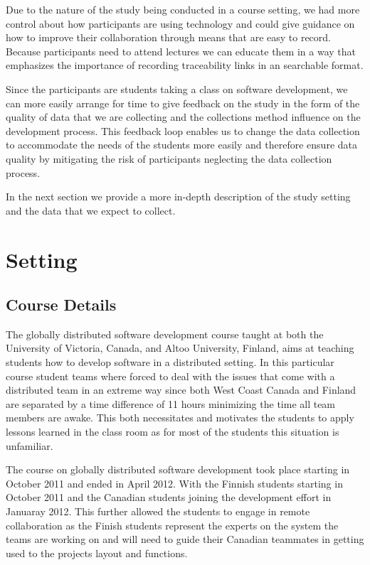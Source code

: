 Due to the nature of the study being conducted in a course setting, we had more control about how participants are using technology and could give guidance on how to improve their collaboration through means that are easy to record.
Because participants need to attend lectures we can educate them in a way that emphasizes the importance of recording traceability links in an searchable format.

Since the participants are students taking a class on software development, we can more easily arrange for time to give feedback on the study in the form of the quality of data that we are collecting and the collections method influence on the development process.
This feedback loop enables us to change the data collection to accommodate the needs of the students more easily and therefore ensure data quality by mitigating the risk of participants neglecting the data collection process. 

In the next section we provide a more in-depth description of the study setting and the data that we expect to collect.

\section{Setting}
\subsection{Course Details}
The globally distributed software development course taught at both the University of Victoria, Canada, and Altoo University, Finland, aims at teaching students how to develop software in a distributed setting.
In this particular course student teams where forced to deal with the issues that come with a distributed team in an extreme way since both West Coast Canada and Finland are separated by a time difference of 11 hours minimizing the time all team members are awake.
This both necessitates and motivates the students to apply lessons learned in the class room as for most of the students this situation is unfamiliar.

The course on globally distributed software development took place starting in October 2011 and ended in April 2012.
With the Finnish students starting in October 2011 and the Canadian students joining the development effort in Januaray 2012.
This further allowed the students to engage in remote collaboration as the Finish students represent the experts on the system the teams are working on and will need to guide their Canadian teammates in getting used to the projects layout and functions.

